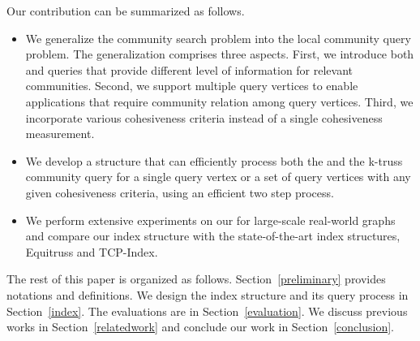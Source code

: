 Our contribution can be summarized as follows.
\begin{itemize}
	\item We generalize the community search problem into the local community query problem. The generalization comprises three aspects. First, we introduce both \toplevelprob{} and \bottomlevelprob{} queries that provide different level of information for relevant communities.  Second, we support multiple query vertices to enable applications that require community relation among query vertices. Third, we incorporate various cohesiveness criteria instead of a single cohesiveness measurement. 
	\item We develop a \twolevelindex{} structure that can efficiently process both the \toplevelprob{} and the \bottomlevelprob{} k-truss community query for a single query vertex or a set of query vertices with any given cohesiveness criteria, using an efficient two step process. 
	\item We perform extensive experiments on our \twolevelindex{} for large-scale real-world graphs and compare our index structure with the state-of-the-art index structures, Equitruss and TCP-Index.   
\end{itemize}

The rest of this paper is organized as follows. Section~\ref{preliminary} provides notations and definitions. We design the index structure and its query process in Section~\ref{index}. The evaluations are in Section~\ref{evaluation}. We discuss previous works in Section~\ref{relatedwork} and conclude our work in Section~\ref{conclusion}.

